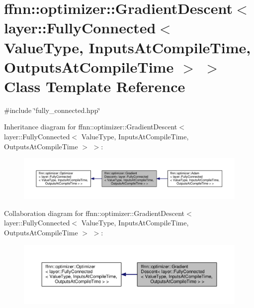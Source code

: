 \hypertarget{classffnn_1_1optimizer_1_1_gradient_descent_3_01layer_1_1_fully_connected_3_01_value_type_00_01_5f7b01db2ae4d39760d70ee323649a60}{\section{ffnn\-:\-:optimizer\-:\-:Gradient\-Descent$<$ layer\-:\-:Fully\-Connected$<$ Value\-Type, Inputs\-At\-Compile\-Time, Outputs\-At\-Compile\-Time $>$ $>$ Class Template Reference}
\label{classffnn_1_1optimizer_1_1_gradient_descent_3_01layer_1_1_fully_connected_3_01_value_type_00_01_5f7b01db2ae4d39760d70ee323649a60}
}


{\ttfamily \#include \char`\"{}fully\-\_\-connected.\-hpp\char`\"{}}



Inheritance diagram for ffnn\-:\-:optimizer\-:\-:Gradient\-Descent$<$ layer\-:\-:Fully\-Connected$<$ Value\-Type, Inputs\-At\-Compile\-Time, Outputs\-At\-Compile\-Time $>$ $>$\-:
\nopagebreak
\begin{figure}[H]
\begin{center}
\leavevmode
\includegraphics[width=350pt]{classffnn_1_1optimizer_1_1_gradient_descent_3_01layer_1_1_fully_connected_3_01_value_type_00_01_6ae520a76e559ae92ecb449366b20b6e}
\end{center}
\end{figure}


Collaboration diagram for ffnn\-:\-:optimizer\-:\-:Gradient\-Descent$<$ layer\-:\-:Fully\-Connected$<$ Value\-Type, Inputs\-At\-Compile\-Time, Outputs\-At\-Compile\-Time $>$ $>$\-:
\nopagebreak
\begin{figure}[H]
\begin{center}
\leavevmode
\includegraphics[width=350pt]{classffnn_1_1optimizer_1_1_gradient_descent_3_01layer_1_1_fully_connected_3_01_value_type_00_01_4afe58a57291e79801d5016d5e771823}
\end{center}
\end{figure}
